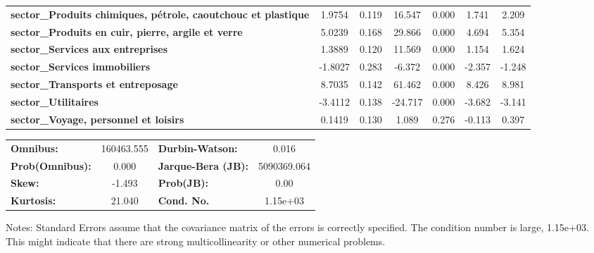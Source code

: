 \begin{center}
\begin{tabular}{lcccccc}
\textbf{sector\_Produits chimiques, pétrole, caoutchouc et plastique} &       1.9754  &        0.119     &    16.547  &         0.000        &        1.741    &        2.209     \\
\textbf{sector\_Produits en cuir, pierre, argile et verre}            &       5.0239  &        0.168     &    29.866  &         0.000        &        4.694    &        5.354     \\
\textbf{sector\_Services aux entreprises}                             &       1.3889  &        0.120     &    11.569  &         0.000        &        1.154    &        1.624     \\
\textbf{sector\_Services immobiliers}                                 &      -1.8027  &        0.283     &    -6.372  &         0.000        &       -2.357    &       -1.248     \\
\textbf{sector\_Transports et entreposage}                            &       8.7035  &        0.142     &    61.462  &         0.000        &        8.426    &        8.981     \\
\textbf{sector\_Utilitaires}                                          &      -3.4112  &        0.138     &   -24.717  &         0.000        &       -3.682    &       -3.141     \\
\textbf{sector\_Voyage, personnel et loisirs}                         &       0.1419  &        0.130     &     1.089  &         0.276        &       -0.113    &        0.397     \\
\bottomrule
\end{tabular}
\begin{tabular}{lclc}
\textbf{Omnibus:}       & 160463.555 & \textbf{  Durbin-Watson:     } &      0.016   \\
\textbf{Prob(Omnibus):} &    0.000   & \textbf{  Jarque-Bera (JB):  } & 5090369.064  \\
\textbf{Skew:}          &   -1.493   & \textbf{  Prob(JB):          } &       0.00   \\
\textbf{Kurtosis:}      &   21.040   & \textbf{  Cond. No.          } &   1.15e+03   \\
\bottomrule
\end{tabular}
\end{center}

Notes: \newline
 [1] Standard Errors assume that the covariance matrix of the errors is correctly specified. \newline
 [2] The condition number is large, 1.15e+03. This might indicate that there are \newline
 strong multicollinearity or other numerical problems.